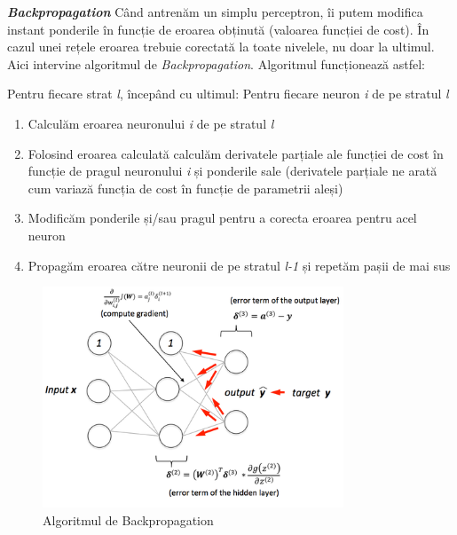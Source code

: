 \textit{\textbf{Backpropagation}}
Când antrenăm un simplu perceptron, îi putem modifica instant ponderile în funcție de eroarea obținută (valoarea funcției de cost). În cazul unei rețele eroarea trebuie corectată la toate nivelele, nu doar la ultimul. Aici intervine algoritmul de \textit{Backpropagation}.
Algoritmul funcționează astfel:\cite{benchea-course}

Pentru fiecare strat \textit{l}, începând cu ultimul:
\quad Pentru fiecare neuron \textit{i} de pe stratul \textit{l}
\begin{enumerate}
    \item Calculăm eroarea neuronului \textit{i} de pe stratul \textit{l}
    \item Folosind eroarea calculată calculăm derivatele parțiale ale funcției de cost în funcție de pragul neuronului \textit{i} și ponderile sale (derivatele parțiale ne arată cum variază funcția de cost în funcție de parametrii aleși)
    \item Modificăm ponderile și/sau pragul pentru a corecta eroarea pentru acel neuron
    \item Propagăm eroarea către neuronii de pe stratul \textit{l-1} și repetăm pașii de mai sus
\end{enumerate}{}

\begin{figure}[!htbp]
    \begin{center}
        \includegraphics[width=0.8\textwidth]{images/backpropagation.png}
        \caption{Algoritmul de Backpropagation\cite{backpropagation}}
    \end{center}
\end{figure}